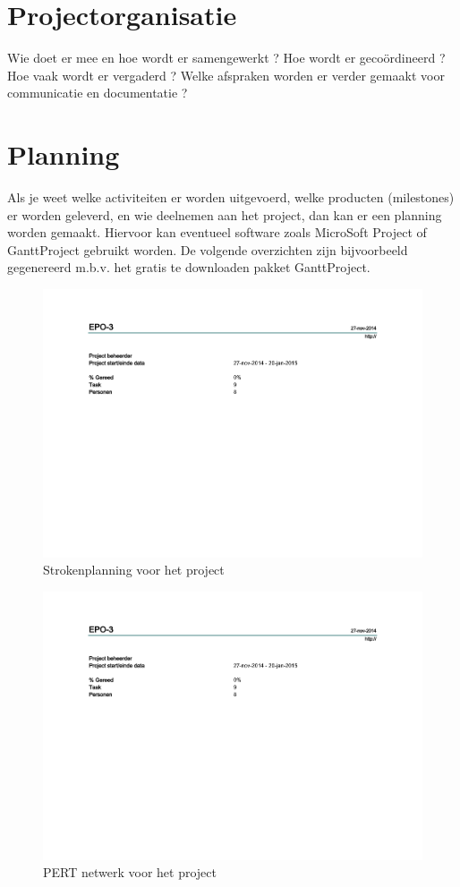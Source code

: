 \documentclass[11pt,twoside,a4paper]{article}
\begin{document}
\section{Projectorganisatie}
Wie doet er mee en hoe wordt er samengewerkt ?  Hoe wordt er gecoördineerd ?  Hoe vaak wordt er vergaderd ?  Welke afspraken worden er verder gemaakt voor communicatie en documentatie ?
\section{Planning}
Als je weet welke activiteiten er worden uitgevoerd, welke producten (milestones) er worden geleverd, en wie deelnemen aan het project, dan kan er een planning worden gemaakt. Hiervoor kan eventueel software zoals MicroSoft Project of GanttProject gebruikt worden.  De volgende overzichten zijn bijvoorbeeld gegenereerd m.b.v. het gratis te downloaden pakket GanttProject.

\begin{figure}[h!]
\includegraphics[width=\textwidth,height=\textheight,keepaspectratio,page=4]{planning}
\caption{Strokenplanning voor het project}
\label{strokenplan}
\end{figure}

\begin{figure}[h!]
\includegraphics[width=\textwidth,height=\textheight,keepaspectratio,page=5]{planning}
\caption{PERT netwerk voor het project}
\label{PERT}
\end{figure}
\end{document}
